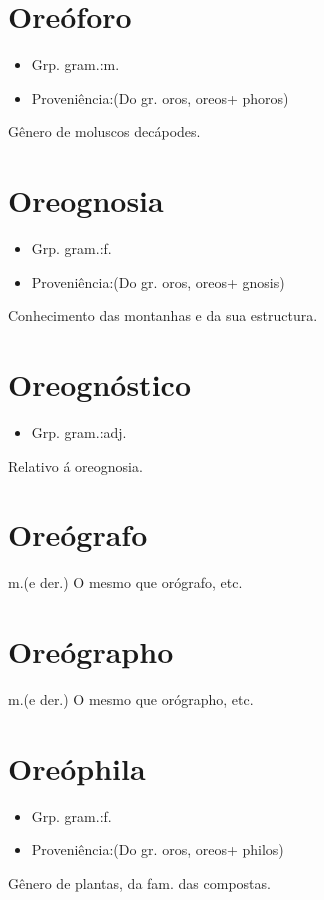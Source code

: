 \section{Oreóforo}
\begin{itemize}
\item {Grp. gram.:m.}
\end{itemize}
\begin{itemize}
\item {Proveniência:(Do gr. \textunderscore oros\textunderscore , \textunderscore oreos\textunderscore  + \textunderscore phoros\textunderscore )}
\end{itemize}
Gênero de moluscos decápodes.
\section{Oreognosia}
\begin{itemize}
\item {Grp. gram.:f.}
\end{itemize}
\begin{itemize}
\item {Proveniência:(Do gr. \textunderscore oros\textunderscore , \textunderscore oreos\textunderscore  + \textunderscore gnosis\textunderscore )}
\end{itemize}
Conhecimento das montanhas e da sua estructura.
\section{Oreognóstico}
\begin{itemize}
\item {Grp. gram.:adj.}
\end{itemize}
Relativo á oreognosia.
\section{Oreógrafo}
\textunderscore m.\textunderscore  (e der.)
O mesmo que \textunderscore orógrafo\textunderscore , etc.
\section{Oreógrapho}
\textunderscore m.\textunderscore  (e der.)
O mesmo que \textunderscore orógrapho\textunderscore , etc.
\section{Oreóphila}
\begin{itemize}
\item {Grp. gram.:f.}
\end{itemize}
\begin{itemize}
\item {Proveniência:(Do gr. \textunderscore oros\textunderscore , \textunderscore oreos\textunderscore  + \textunderscore philos\textunderscore )}
\end{itemize}
Gênero de plantas, da fam. das compostas.
